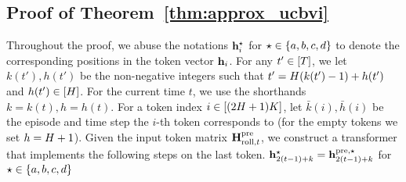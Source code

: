 \subsection{Proof of Theorem~\ref{thm:approx_ucbvi}}\label{sec:pf_approx_ucbvi}
Throughout the proof, we abuse the notations ${\mathbf h}_i^{\star}$ for $\star\in\{{a},{b},{c},{d}\}$ to denote the corresponding positions in the token vector ${\mathbf h}_i$. For any $t'\in[{T}]$, we let $k(t'),h(t')$ be the non-negative integers such that $t'={H}(k(t')-1)+h(t')$ and $h(t')\in[{H}]$. For the current time $t$, we use the shorthands $k=k(t),h=h(t)$.  For a token index $i\in[(2{H}+1){K}]$, let $\bar{k}(i),\bar{h}(i)$ be the episode and time step the $i$-th token corresponds to (for the empty tokens we set $h={H}+1$). 
Given the input token matrix ${\mathbf H}^{\mathrm{pre}}_{{\mathrm{roll}},t}$, we construct a transformer that implements the following steps on the last token. 
${\mathbf h}^{\star}_{2(t-1)+k}={\mathbf h}^{{\mathrm{pre}},\star}_{2(t-1)+k}$ for $\star\in\{{a},{b},{c},{d}\}$ 
